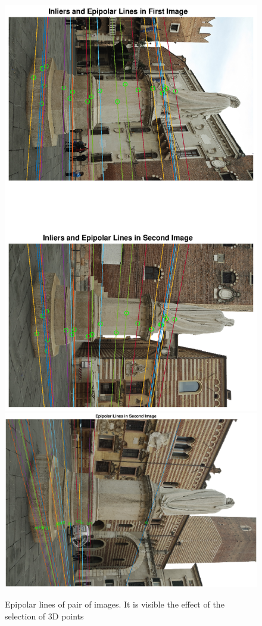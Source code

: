 \documentclass[11pt]{article}
\begin{document}
\begin{figure}[H]
    \centering
    \includegraphics[scale=0.5]{images/epipolar3.eps}
    \qquad
    \includegraphics[scale=0.5]{images/epipolar4.eps}
    \caption{Epipolar lines of pair of images. It is visible the effect of the selection of 3D points}
    \label{fig:epipolar2}
\end{figure}
\end{document}
